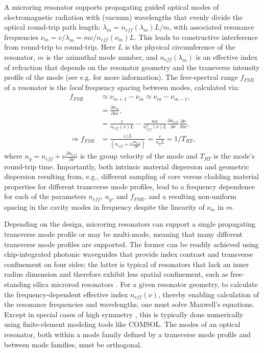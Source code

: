 A microring resonator supports propagating guided optical modes of electromagnetic radiation with (vacuum) wavelengths that evenly divide the optical round-trip path length: $\lambda_m=n_{eff}(\lambda_m)L/m$, with associated resonance frequencies $\nu_m=c/\lambda_m=mc/n_{eff}(\nu_m)L$. This leads to constructive interference from round-trip to round-trip. Here $L$ is the physical circumference of the resonator, $m$ is the azimuthal mode number, and $n_{eff}(\lambda_m)$ is an effective index of refraction that depends on the resonator geometry and the transverse intensity profile of the mode (see e.g. \cite{REFHERE} for more information). The free-spectral range $f_{FSR}$ of a resonator is the \textit{local} frequency spacing between modes, calculated via:
\begin{align}
	f_{FSR}&\approx \nu_{m+1}-\nu_{m}\approx \nu_{m}-\nu_{m-1},\\
	&=\frac{\partial\nu_m}{\partial m},\\
	&=\frac{c}{n_{eff}(\nu)L}-\frac{mc}{n_{eff}^2(\nu)L}\frac{\partial n_{eff}}{\partial \nu}\frac{\partial \nu}{\partial m},\\
	\Rightarrow f_{FSR}&=\frac{c/L}{\left(n_{eff}+\nu\frac{\partial n_{eff}}{\partial \nu}\right)}=\frac{c}{n_g L}=1/T_{RT},
\end{align}
	where $n_g=n_{eff}+\nu\frac{\partial n_{eff}}{\partial \nu}$ is the group velocity of the mode and $T_{RT}$ is the mode's round-trip time. Importantly, both intrinsic material dispersion and geometric dispersion resulting from, e.g., different sampling of core versus cladding material properties for different transverse mode profiles, lead to a frequency dependence for each of the parameters $n_{eff}$, $n_g$, and $f_{FSR}$, and a resulting non-uniform spacing in the cavity modes in frequency despite the linearity of $\nu_m$ in $m$. 
	
	 Depending on the design, microring resonators can support a single propagating transverse mode profile or may be multi-mode, meaning that many different transverse mode profiles are supported. The former can be readily achieved using chip-integrated photonic waveguides that provide index contrast and transverse confinement on four sides; the latter is typical of resonators that lack an inner radius dimension and therefore exhibit less spatial confinement, such as free-standing silica microrod resonators \cite{DelHaye2013}. For a given resonator geometry, to calculate the frequency-dependent effective index $n_{eff}(\nu)$, thereby enabling calculation of the resonance frequencies and wavelengths, one must solve Maxwell's equations. Except in special cases of high symmetry \cite{Oraevsky2002}, this is typically done numerically using finite-element modeling tools like COMSOL. The modes of an optical resonator, both within a mode family defined by a transverse mode profile and between mode families, must be orthogonal\cite{Haus1984}.

